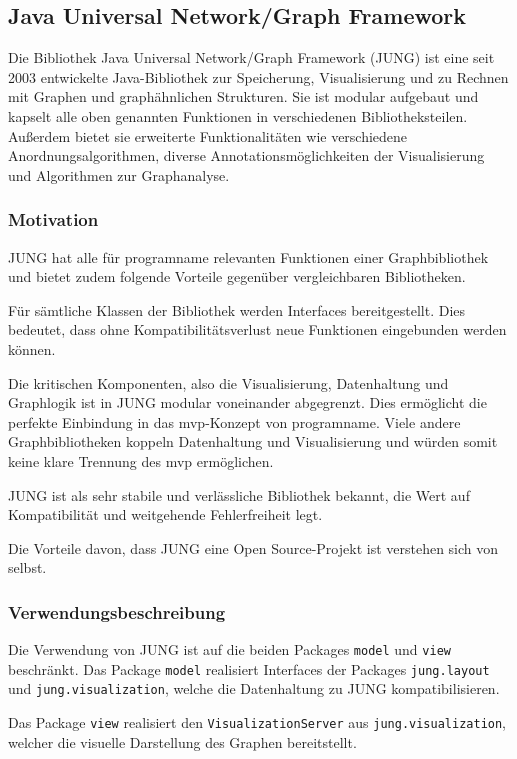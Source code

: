 \subsection{Java Universal Network/Graph Framework}
Die Bibliothek Java Universal Network/Graph Framework (JUNG) ist eine seit 2003 entwickelte Java-Bibliothek zur Speicherung, Visualisierung und zu Rechnen mit Graphen und graphähnlichen Strukturen. Sie ist modular aufgebaut und kapselt alle oben genannten Funktionen in verschiedenen Bibliotheksteilen. Außerdem bietet sie erweiterte Funktionalitäten wie verschiedene Anordnungsalgorithmen, diverse Annotationsmöglichkeiten der Visualisierung und Algorithmen zur Graphanalyse.
\subsubsection{Motivation}
JUNG hat alle für \gls{programname} relevanten Funktionen einer Graphbibliothek und bietet zudem folgende Vorteile gegenüber vergleichbaren Bibliotheken.

Für sämtliche Klassen der Bibliothek werden Interfaces bereitgestellt. Dies bedeutet, dass ohne Kompatibilitätsverlust neue Funktionen eingebunden werden können.

Die kritischen Komponenten, also die Visualisierung, Datenhaltung und Graphlogik ist in JUNG modular voneinander abgegrenzt. Dies ermöglicht die perfekte Einbindung in das \gls{mvp}-Konzept von \gls{programname}. Viele andere Graphbibliotheken koppeln Datenhaltung und Visualisierung und würden somit keine klare Trennung des \gls{mvp} ermöglichen.

JUNG ist als sehr stabile und verlässliche Bibliothek bekannt, die Wert auf Kompatibilität und weitgehende Fehlerfreiheit legt.

Die Vorteile davon, dass JUNG eine Open Source-Projekt ist verstehen sich von selbst.

\subsubsection{Verwendungsbeschreibung}

Die Verwendung von JUNG ist auf die beiden Packages \texttt{model} und  \texttt{view} beschränkt. Das Package \texttt{model} realisiert Interfaces der Packages \texttt{jung.layout} und \texttt{jung.visualization}, welche die Datenhaltung zu JUNG kompatibilisieren.

Das Package \texttt{view} realisiert den \texttt{VisualizationServer} aus \texttt{jung.visualization}, welcher die visuelle Darstellung des Graphen bereitstellt.
